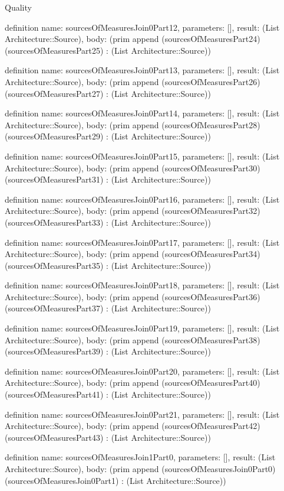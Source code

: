 \begin{lexlean}{Quality}
\begin{semanticmodule}
definition{
  name: sourcesOfMeasuresJoin0Part12,
  parameters: [],
  result: (List Architecture::Source),
  body: (prim append (sourcesOfMeasuresPart24) (sourcesOfMeasuresPart25) : (List Architecture::Source))
}

definition{
  name: sourcesOfMeasuresJoin0Part13,
  parameters: [],
  result: (List Architecture::Source),
  body: (prim append (sourcesOfMeasuresPart26) (sourcesOfMeasuresPart27) : (List Architecture::Source))
}

definition{
  name: sourcesOfMeasuresJoin0Part14,
  parameters: [],
  result: (List Architecture::Source),
  body: (prim append (sourcesOfMeasuresPart28) (sourcesOfMeasuresPart29) : (List Architecture::Source))
}

definition{
  name: sourcesOfMeasuresJoin0Part15,
  parameters: [],
  result: (List Architecture::Source),
  body: (prim append (sourcesOfMeasuresPart30) (sourcesOfMeasuresPart31) : (List Architecture::Source))
}

definition{
  name: sourcesOfMeasuresJoin0Part16,
  parameters: [],
  result: (List Architecture::Source),
  body: (prim append (sourcesOfMeasuresPart32) (sourcesOfMeasuresPart33) : (List Architecture::Source))
}

definition{
  name: sourcesOfMeasuresJoin0Part17,
  parameters: [],
  result: (List Architecture::Source),
  body: (prim append (sourcesOfMeasuresPart34) (sourcesOfMeasuresPart35) : (List Architecture::Source))
}

definition{
  name: sourcesOfMeasuresJoin0Part18,
  parameters: [],
  result: (List Architecture::Source),
  body: (prim append (sourcesOfMeasuresPart36) (sourcesOfMeasuresPart37) : (List Architecture::Source))
}

definition{
  name: sourcesOfMeasuresJoin0Part19,
  parameters: [],
  result: (List Architecture::Source),
  body: (prim append (sourcesOfMeasuresPart38) (sourcesOfMeasuresPart39) : (List Architecture::Source))
}

definition{
  name: sourcesOfMeasuresJoin0Part20,
  parameters: [],
  result: (List Architecture::Source),
  body: (prim append (sourcesOfMeasuresPart40) (sourcesOfMeasuresPart41) : (List Architecture::Source))
}

definition{
  name: sourcesOfMeasuresJoin0Part21,
  parameters: [],
  result: (List Architecture::Source),
  body: (prim append (sourcesOfMeasuresPart42) (sourcesOfMeasuresPart43) : (List Architecture::Source))
}

definition{
  name: sourcesOfMeasuresJoin1Part0,
  parameters: [],
  result: (List Architecture::Source),
  body: (prim append (sourcesOfMeasuresJoin0Part0) (sourcesOfMeasuresJoin0Part1) : (List Architecture::Source))
}


\end{semanticmodule}
\end{lexlean}
